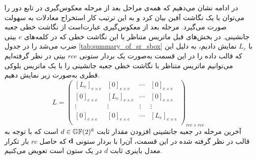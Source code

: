 در ادامه نشان می‌دهیم که همه‌ی مراحل بعد از مرحله معکوس‌گیری در تابع دور 
را می‌توان با یک نگاشت آفین بیان کرد و به این ترتیب کار استخراج معادلات به سهولت صورت می‌گیرد. مرحله بعد از معکوس‌گیری عبارت‌است از نگاشت خطی جعبه جانشینی. در بخش‌های قبل ماتریس متناظر با این نگاشت خطی  که در کلمه‌های 
$e$
بیتی ضرب می‌شد را  در جدول 
\ref{tab:summary_of_sr_sbox}
با 
$L_{e}$
نمایش دادیم، به دلیل این که قالب داده را در این قسمت به‌صورت یک بردار ستونی 
$rce$
بیتی در نظر گرفته‌ایم می‌توانیم ماتریس متناظر با نگاشت خطی جعبه جانشینی را با یک ماتریس  بلوکی قطری به‌صورت زیر نمایش دهیم.
$$ 
L = \begin{pmatrix}
[L_{e}]_{e\times e}&[0]_{e\times e}&\cdots&[0]_{e\times e}\\
[0]_{e\times e}&[L_{e}]_{e\times e}&\cdots&[0]_{e\times e}\\
\vdots&\vdots&\vdots&\vdots\\
[0]_{e\times e}&[0]_{e\times e}&\cdots& [L_{e}]_{e\times e}\\
\end{pmatrix}_{rce\times rce}
$$
آخرین مرحله در جعبه جانشینی افزودن مقدار ثابت 
$d\in\mathbb{GF}(2)^{8}$
است که با توجه به قالب در نظر گرفته شده در این قسمت، آن‌را با بردار ستونی 
$\bf{d}$
که حاصل 
$rc$
بار تکرار معدل باینری ثابت 
$d$
در یک ستون است تعویض می‌کنیم. 

